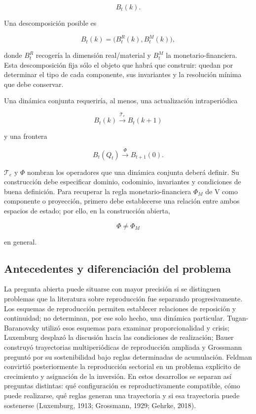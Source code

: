 \documentclass[10pt,a5paper,twoside]{article}
\begin{document}
\[
B_t(k).
\]

Una descomposición posible es

\[
B_t(k)
=
\bigl(
B_t^R(k),
B_t^M(k)
\bigr),
\]

donde \(B_t^R\) recogería la dimensión real/material y \(B_t^M\) la
monetario-financiera. Esta descomposición fija sólo el objeto que habrá que construir: quedan por
determinar el tipo de cada componente, sus invariantes y la resolución
mínima que debe conservar.

Una dinámica conjunta requeriría, al menos, una actualización
intraperiódica

\[
B_t(k)
\xrightarrow{\mathcal T_e}
B_t(k+1)
\]

y una frontera

\[
B_t(Q_t)
\xrightarrow{\Phi}
B_{t+1}(0).
\]

\(\mathcal T_e\) y \(\Phi\) nombran los operadores que una dinámica
conjunta deberá definir. Su construcción debe especificar
dominio, codominio, invariantes y condiciones de buena definición. Para recuperar la regla monetario-financiera \(\Phi_M\) de V como componente
o proyección, primero debe establecerse una relación entre ambos espacios de
estado; por ello, en la construcción abierta,

\[
\Phi\ne\Phi_M
\]

en general.

\subsection{Antecedentes y diferenciación del problema}\label{antecedentes-y-diferenciacion-del-problema}

La pregunta abierta puede situarse con mayor precisión si se distinguen
problemas que la literatura sobre reproducción fue separando progresivamente.
Los esquemas de reproducción permiten establecer relaciones de reposición y
continuidad; no determinan, por ese solo hecho, una dinámica particular.
Tugan-Baranovsky utilizó esos esquemas para examinar proporcionalidad y crisis;
Luxemburg desplazó la discusión hacia las condiciones de realización; Bauer
construyó trayectorias multiperiódicas de reproducción ampliada y Grossmann
preguntó por su sostenibilidad bajo reglas determinadas de acumulación. Feldman
convirtió posteriormente la reproducción sectorial en un problema explícito de
crecimiento y asignación de la inversión. En estos desarrollos se separan así
preguntas distintas: qué configuración es reproductivamente compatible, cómo
puede realizarse, qué reglas generan una trayectoria y si esa trayectoria puede
sostenerse (Luxemburg, 1913; Grossmann, 1929; Gehrke, 2018).
\end{document}

